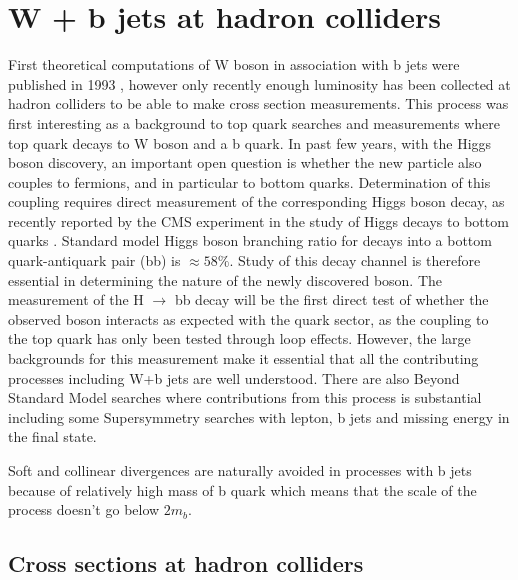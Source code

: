 
\section{W + b jets at hadron colliders}

First theoretical computations of W boson in association with b jets were published in 1993 \cite{Mangano:1992kp}, however only recently enough luminosity has been collected at hadron colliders to be able to make cross section measurements. This process was first interesting as a background to top quark searches and measurements where top quark decays to W boson and a b quark. In past few years, with the Higgs boson discovery, an important open question is whether the new particle also couples to fermions, and in particular to bottom quarks. Determination of this coupling requires
direct measurement of the corresponding Higgs boson decay, as recently reported
by the CMS experiment in the study of Higgs decays to bottom quarks \cite{Chatrchyan:2013zna,Chatrchyan:2014vua}.
Standard model Higgs boson branching ratio for decays into a bottom quark-antiquark
pair (bb) is $\approx 58\%$. Study of this decay channel is therefore essential in determining the nature of the newly discovered boson. The measurement of the H $\rightarrow$ bb decay will be the first direct test of whether the observed boson interacts as expected with the quark sector, as the coupling to the top quark has only been tested through loop effects. However, the large backgrounds for this measurement make it essential that all the contributing processes including W+b jets are well understood.
There are also Beyond Standard Model searches where contributions from this process is substantial including some Supersymmetry searches with lepton, b jets and missing energy in the final state.

Soft and collinear divergences are naturally avoided in processes with b jets because of relatively high mass of b quark which means that the scale of the process doesn't go below $2m_b$.



\subsection{Cross sections at hadron colliders}
\label{subsec:2.1}

